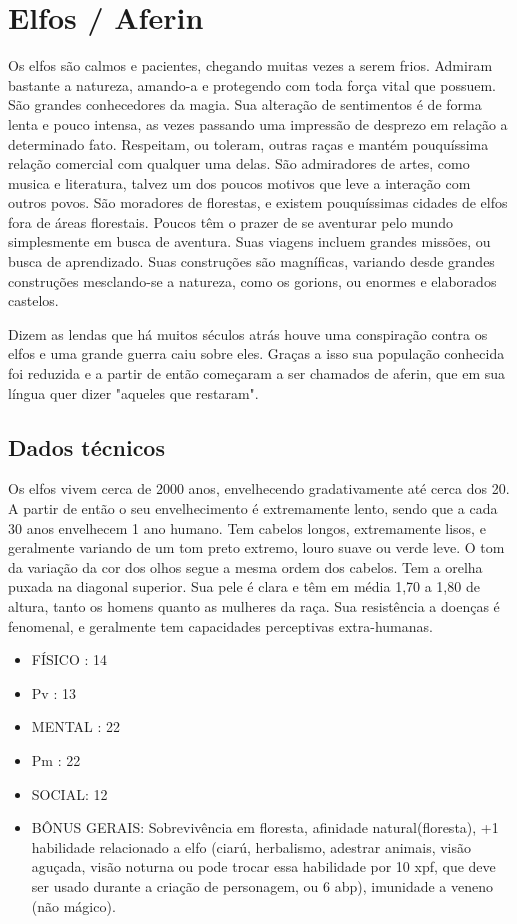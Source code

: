 \section{Elfos / Aferin}

Os elfos são calmos e pacientes, chegando muitas vezes a serem frios. Admiram bastante a natureza, amando-a e protegendo com toda força vital que possuem. São grandes conhecedores da magia. Sua alteração de sentimentos é de forma lenta e pouco intensa, as vezes passando uma impressão de desprezo em relação a determinado fato. Respeitam, ou toleram, outras raças e mantém pouquíssima relação comercial com qualquer uma delas. São admiradores de artes, como musica e literatura, talvez um dos poucos motivos que leve a interação com outros povos. São moradores de florestas, e existem pouquíssimas cidades de elfos fora de áreas florestais.  Poucos têm o prazer de se aventurar pelo mundo simplesmente em busca de aventura. Suas viagens incluem grandes missões, ou busca de aprendizado. Suas construções são magníficas, variando desde grandes construções mesclando-se a natureza, como os gorions, ou enormes e elaborados castelos.

Dizem as lendas que há muitos séculos atrás houve uma conspiração contra os elfos e uma grande guerra caiu sobre eles. Graças a isso sua população conhecida foi reduzida e a partir de então começaram a ser chamados de aferin, que em sua língua quer dizer "aqueles que restaram". 


\subsection{Dados técnicos}

Os elfos vivem cerca de 2000 anos, envelhecendo gradativamente até cerca dos 20. A partir de então o seu envelhecimento é extremamente lento, sendo que a cada 30 anos envelhecem 1 ano humano. Tem cabelos longos, extremamente lisos, e geralmente variando de um tom preto extremo, louro suave ou verde leve. O tom da variação da cor dos olhos segue a mesma ordem dos cabelos. Tem a orelha puxada na diagonal superior. Sua pele é clara e têm em média 1,70 a 1,80 de altura, tanto os homens quanto as mulheres da raça. Sua resistência a doenças é fenomenal, e geralmente tem capacidades perceptivas extra-humanas.

\begin{itemize}
	\item FÍSICO : 14
	\item Pv : 13 

	\item MENTAL : 22
	\item Pm : 22
	\item SOCIAL: 12

	\item BÔNUS GERAIS: Sobrevivência em floresta, afinidade natural(floresta),  +1 habilidade relacionado a elfo (ciarú, herbalismo, adestrar animais, visão aguçada, visão noturna ou pode trocar essa habilidade por 10 xpf, que deve ser usado durante a criação de personagem, ou 6 abp), imunidade a veneno (não mágico). 
\end{itemize}

